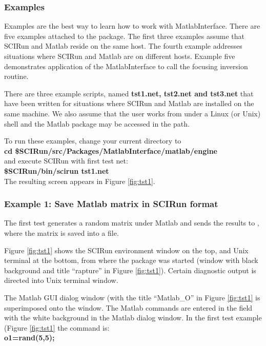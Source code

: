 \subsubsection{Examples} \indent

Examples are the best way to learn how to work with MatlabInterface.
There are five examples attached to the package. The first three
examples assume that SCIRun and Matlab reside on the same host.
The fourth example addresses situations where SCIRun and Matlab are
on different hosts. Example five demonstrates
application of the MatlabInterface to call the focusing inversion routine.

There are three example scripts, named {\bf tst1.net, tst2.net and tst3.net}
that have been written for situations where SCIRun and 
Matlab are installed on the same machine. 
We also assume that the user works from under a Linux (or Unix)
shell and the Matlab package may be accessed in the path. 

To run these examples, change your current directory to \\
{\bf cd \$SCIRun/src/Packages/MatlabInterface/matlab/engine } \\
and execute SCIRun with first test net: \\
{\bf \$SCIRun/bin/scirun  tst1.net} \\
The resulting screen appears in Figure \ref{fig:tst1}.

\subsubsection{Example 1: Save Matlab matrix in SCIRun format} \indent

The first test generates a random matrix under Matlab and sends the
results to \sr{}, where the matrix is saved into a \sr{} file. 

Figure \ref{fig:tst1} shows the SCIRun environment window on the top,
and Unix terminal at the bottom, from where the package was started
(window with black background and title ``rapture'' in Figure 
\ref{fig:tst1}).  Certain diagnostic output is directed into Unix 
terminal window. 

The Matlab GUI dialog window (with the title
``Matlab\_O'' in Figure \ref{fig:tst1} is superimposed onto the \sr{}
window. The Matlab commands are entered in the field with the white
background in the Matlab dialog window.
In the first test example (Figure \ref{fig:tst1}
the command is: \\
{\bf o1=rand(5,5);} \\

